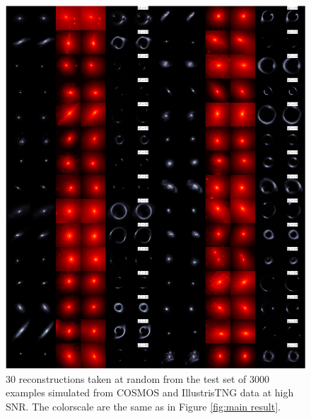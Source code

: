 \begin{figure}[H]
        \centering
        \includegraphics[width=\linewidth]{figures/test_set_no_cherry_pick}
        \caption{
                30 reconstructions taken at random from the test set of 3000 examples simulated from COSMOS 
                and IllustrisTNG data at high SNR.
                The colorscale are the same as in Figure \ref{fig:main result}.}
        \label{fig:random sample}
\end{figure}

